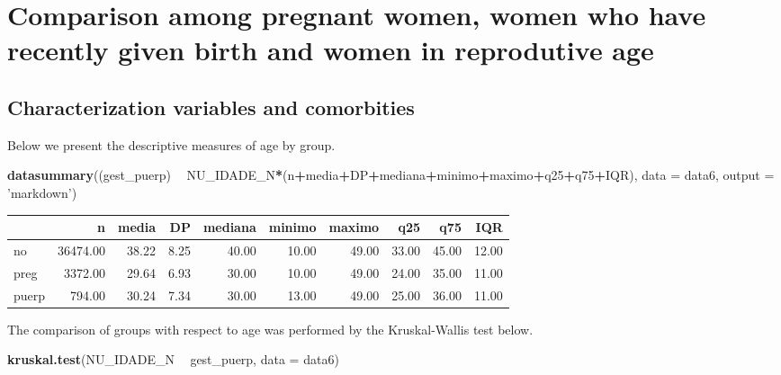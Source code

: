 \documentclass[
]{article}
\newenvironment{Shaded}{\begin{snugshade}}{\end{snugshade}}
\newcommand{\DataTypeTok}[1]{\textcolor[rgb]{0.13,0.29,0.53}{#1}}
\newcommand{\KeywordTok}[1]{\textcolor[rgb]{0.13,0.29,0.53}{\textbf{#1}}}
\newcommand{\NormalTok}[1]{#1}
\newcommand{\OperatorTok}[1]{\textcolor[rgb]{0.81,0.36,0.00}{\textbf{#1}}}
\newcommand{\StringTok}[1]{\textcolor[rgb]{0.31,0.60,0.02}{#1}}
\begin{document}
\hypertarget{comparison-among-pregnant-women-women-who-have-recently-given-birth-and-women-in-reprodutive-age}{%
\section{Comparison among pregnant women, women who have recently given
birth and women in reprodutive
age}\label{comparison-among-pregnant-women-women-who-have-recently-given-birth-and-women-in-reprodutive-age}}

\hypertarget{characterization-variables-and-comorbities-1}{%
\subsection{Characterization variables and
comorbities}\label{characterization-variables-and-comorbities-1}}

Below we present the descriptive measures of age by group.

\begin{Shaded}
\begin{Highlighting}[]
\KeywordTok{datasummary}\NormalTok{((gest_puerp) }\OperatorTok{~}\StringTok{ }\NormalTok{NU_IDADE_N}\OperatorTok{*}\NormalTok{(n}\OperatorTok{+}\NormalTok{media}\OperatorTok{+}\NormalTok{DP}\OperatorTok{+}\NormalTok{mediana}\OperatorTok{+}\NormalTok{minimo}\OperatorTok{+}\NormalTok{maximo}\OperatorTok{+}\NormalTok{q25}\OperatorTok{+}\NormalTok{q75}\OperatorTok{+}\NormalTok{IQR),}
            \DataTypeTok{data =}\NormalTok{ data6, }\DataTypeTok{output =} \StringTok{'markdown'}\NormalTok{)}
\end{Highlighting}
\end{Shaded}

\begin{longtable}[]{@{}lrrrrrrrrr@{}}
\toprule
& n & media & DP & mediana & minimo & maximo & q25 & q75 &
IQR\tabularnewline
\midrule
\endhead
no & 36474.00 & 38.22 & 8.25 & 40.00 & 10.00 & 49.00 & 33.00 & 45.00 &
12.00\tabularnewline
preg & 3372.00 & 29.64 & 6.93 & 30.00 & 10.00 & 49.00 & 24.00 & 35.00 &
11.00\tabularnewline
puerp & 794.00 & 30.24 & 7.34 & 30.00 & 13.00 & 49.00 & 25.00 & 36.00 &
11.00\tabularnewline
\bottomrule
\end{longtable}

The comparison of groups with respect to age was performed by the
Kruskal-Wallis test below.

\begin{Shaded}
\begin{Highlighting}[]
\KeywordTok{kruskal.test}\NormalTok{(NU_IDADE_N }\OperatorTok{~}\StringTok{ }\NormalTok{gest_puerp,}
             \DataTypeTok{data =}\NormalTok{ data6)}
\end{Highlighting}
\end{Shaded}
\end{document}
